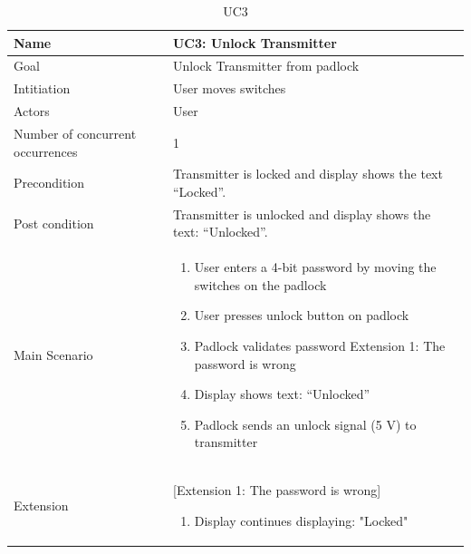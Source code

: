\documentclass[oneside]{memoir}
\begin{document}
\begin{table}[]
\centering
\caption{UC3}
\label{my-label}
\begin{tabularx}{\textwidth}{|l X|}
\hline
Name                             & UC3: Unlock Transmitter   \\ \hline
Goal                             & Unlock Transmitter from padlock   \\ \hline
Intitiation                      & User moves switches          \\ \hline
Actors                           & User                              \\ \hline
Number of concurrent occurrences & 1                                          \\ \hline
Precondition                     & Transmitter is locked and display shows the text “Locked”. \\ \hline
Post condition                   & Transmitter is unlocked and display shows the text: “Unlocked”.  \\ \hline
Main Scenario                    & \begin{enumerate}
                                    \item User enters a 4-bit password by moving the switches on
the padlock
                                    \item User presses unlock button on padlock
                                    \item Padlock validates password
                                    \newline Extension 1: The password is wrong
                                    \item Display shows text: “Unlocked”
                                    \item Padlock sends an unlock signal (5 V) to transmitter
                                    \end{enumerate} \\ \hline
 Extension                      & [Extension 1: The password is wrong]
                                    \newline \begin{enumerate}
                                    \item Display continues displaying: "Locked"
                                    \end{enumerate} \\ \hline
\end{tabularx}
\end{table}
\end{document}
